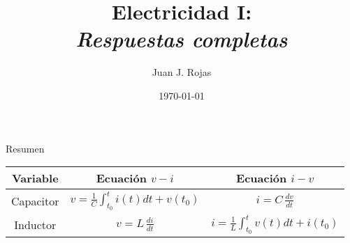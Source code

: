 \documentclass[aspectratio=169]{beamer}
\title{Electricidad I: \\ \emph{Respuestas completas}}
\author{
    Juan J. Rojas
}
\institute{Instituto Tecnológico de Costa Rica}
\date{\today}
\begin{document}

\maketitle

\begin{frame}{Resumen}
    \begin{center}
        \begin{tabularx}{14cm}{C C C}
        \toprule
        Variable & Ecuación $v-i$ & Ecuación $i-v$ \\
        \midrule
       Capacitor & $v=\frac{1}{C}\int_{t_0}^{t} i(t)dt + v(t_0) $ & $i = C\,\frac{dv}{dt}$ \\[5pt]
        Inductor & $v = L\,\frac{di}{dt}$ & $i=\frac{1}{L}\int_{t_0}^{t} v(t)dt + i(t_0) $\\[5pt]
        \bottomrule
        \end{tabularx}   
    \end{center}
\end{frame}
\end{document}

